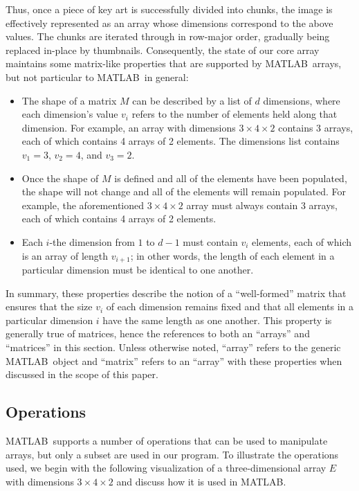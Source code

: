 \documentclass[11pt,conference]{IEEEtran}
\newcommand{\matlab}{MATLAB}
\theoremstyle{plain} %
\theoremstyle{definition}
\theoremstyle{remark}
\begin{document}
Thus, once a piece of key art is successfully divided into chunks, the image is
effectively represented as an array whose dimensions correspond to the above
values. The chunks are iterated through in row-major order, gradually being
replaced in-place by thumbnails. Consequently, the state of our core array
maintains some matrix-like properties that are supported by \matlab\ arrays,
but not particular to \matlab\ in general:

\begin{itemize}
    \item The shape of a matrix \(M\) can be described by a list of \(d\)
        dimensions, where each dimension's value \(v_i\) refers to the number of
        elements held along that dimension. For example, an array with
        dimensions \(3 \times 4 \times 2\) contains 3 arrays, each of which
        contains 4 arrays of 2 elements. The dimensions list contains \(v_1 =
        3\), \(v_2 = 4\), and \(v_3 = 2\).
    \item Once the shape of \(M\) is defined and all of the elements have been
        populated, the shape will not change and all of the elements will remain
        populated. For example, the aforementioned \(3 \times 4 \times 2\) array
        must always contain 3 arrays, each of which contains 4 arrays of 2
        elements.
    \item Each \(i\)-the dimension from \(1\) to \(d-1\) must contain \(v_i\)
        elements, each of which is an array of length \(v_{i+1}\); in other
        words, the length of each element in a particular dimension must be
        identical to one another.
\end{itemize}

In summary, these properties describe the notion of a ``well-formed'' matrix
that ensures that the size \(v_i\) of each dimension remains fixed and that all
elements in a particular dimension \(i\) have the same length as one another.
This property is generally true of matrices, hence the references to both an
``arrays'' and ``matrices'' in this section. Unless otherwise noted, ``array''
refers to the generic \matlab\ object and ``matrix'' refers to an ``array'' with
these properties when discussed in the scope of this paper.

\subsection{Operations}

\matlab\ supports a number of operations that can be used to manipulate arrays,
but only a subset are used in our program. To illustrate the operations used, we
begin with the following visualization of a three-dimensional array \(E\) with
dimensions \(3 \times 4 \times 2\) and discuss how it is used in \matlab.
\end{document}
